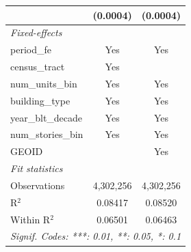 \begin{tabular}{lcc}
                                                                       & (0.0004)               & (0.0004)\\   
   \midrule
   \emph{Fixed-effects}\\
   period\_fe                                                          & Yes                    & Yes\\  
   census\_tract                                                       & Yes                    & \\  
   num\_units\_bin                                                     & Yes                    & Yes\\  
   building\_type                                                      & Yes                    & Yes\\  
   year\_blt\_decade                                                   & Yes                    & Yes\\  
   num\_stories\_bin                                                   & Yes                    & Yes\\  
   GEOID                                                               &                        & Yes\\  
   \midrule
   \emph{Fit statistics}\\
   Observations                                                        & 4,302,256              & 4,302,256\\  
   R$^2$                                                               & 0.08417                & 0.08520\\  
   Within R$^2$                                                        & 0.06501                & 0.06463\\  
   \midrule \midrule
   \multicolumn{3}{l}{\emph{Signif. Codes: ***: 0.01, **: 0.05, *: 0.1}}\\
\end{tabular}
\par\endgroup
\begingroup
\centering
